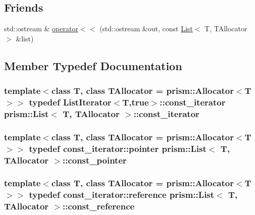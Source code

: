 \subsection*{Friends}
\begin{DoxyCompactItemize}
\item 
std\+::ostream \& \hyperlink{classprism_1_1_list_a45cd60cf5029dcfd4b3f6175878008d0}{operator$<$$<$} (std\+::ostream \&out, const \hyperlink{classprism_1_1_list}{List}$<$ T, T\+Allocator $>$ \&list)
\end{DoxyCompactItemize}


\subsection{Member Typedef Documentation}
\subsubsection[{\texorpdfstring{const\+\_\+iterator}{const_iterator}}]{\setlength{\rightskip}{0pt plus 5cm}template$<$class T, class T\+Allocator = prism\+::\+Allocator$<$\+T$>$$>$ typedef {\bf List\+Iterator}$<$T,true$>$\+::{\bf const\+\_\+iterator} {\bf prism\+::\+List}$<$ T, T\+Allocator $>$\+::{\bf const\+\_\+iterator}}\hypertarget{classprism_1_1_list_a82987892223347376baec1efd26aa655}{}\label{classprism_1_1_list_a82987892223347376baec1efd26aa655}
\subsubsection[{\texorpdfstring{const\+\_\+pointer}{const_pointer}}]{\setlength{\rightskip}{0pt plus 5cm}template$<$class T, class T\+Allocator = prism\+::\+Allocator$<$\+T$>$$>$ typedef {\bf const\+\_\+iterator\+::pointer} {\bf prism\+::\+List}$<$ T, T\+Allocator $>$\+::{\bf const\+\_\+pointer}}\hypertarget{classprism_1_1_list_a7510b11c3c426f8504ddf024be7aaa89}{}\label{classprism_1_1_list_a7510b11c3c426f8504ddf024be7aaa89}
\subsubsection[{\texorpdfstring{const\+\_\+reference}{const_reference}}]{\setlength{\rightskip}{0pt plus 5cm}template$<$class T, class T\+Allocator = prism\+::\+Allocator$<$\+T$>$$>$ typedef {\bf const\+\_\+iterator\+::reference} {\bf prism\+::\+List}$<$ T, T\+Allocator $>$\+::{\bf const\+\_\+reference}}\hypertarget{classprism_1_1_list_a31c013c3f9135c28c3c4bf489fbeb322}{}\label{classprism_1_1_list_a31c013c3f9135c28c3c4bf489fbeb322}
